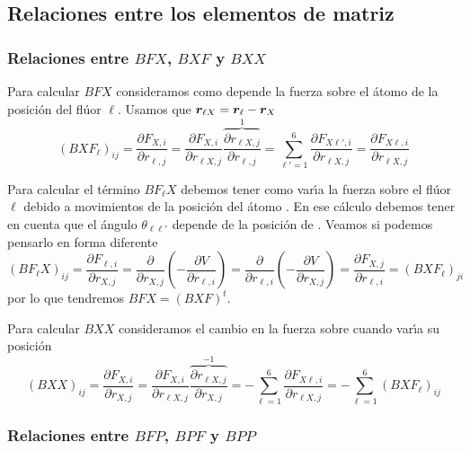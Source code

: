\subsection{Relaciones entre los elementos de matriz}
\label{S:relaciones-elementos}


\subsubsection{Relaciones entre $BFX$, $BXF$ y $BXX$}
Para calcular $BFX$ consideramos como depende la fuerza sobre el \'{a}tomo   de la posici\'{o}n del fl\'{u}or $\ell$. 
Usamos que $\bm{r}_{\ell X} = \bm{r}_{\ell} - \bm{r}_{X}$
\begin{equation}
  \label{Q:BXF-1}
  (BXF_{\ell})_{ij} = \frac{\partial F_{X,i}}{\partial r_{\ell,j}} = \frac{\partial F_{X,i}}{\partial r_{\ell X,j}} \overbrace{\frac{\partial r_{\ell X,j}}{\partial r_{\ell,j}}}^{1} = \sum_{\ell'=1}^{6} \frac{\partial F_{X\ell',i}}{\partial r_{\ell X,j}} = \frac{\partial F_{X\ell,i}}{\partial r_{\ell X,j}}
\end{equation}

Para calcular el t\'{e}rmino $BF_{\ell}X$ debemos tener como var\'{\i}a la fuerza sobre el fl\'{u}or $\ell$ debido a movimientos de la posici\'{o}n del \'{a}tomo . En ese c\'{a}lculo debemos tener en cuenta que el \'{a}ngulo $\theta_{\ell \ell'} $ depende de la posici\'{o}n de .
Veamos si podemos pensarlo en forma diferente
\begin{equation}
  \label{Q:BFX-1}
  (BF_{\ell}X)_{ij} = \frac{\partial F_{\ell,i}}{\partial r_{X,j}} = \frac{\partial}{\partial r_{X,j}} \left(- \frac{\partial V}{\partial r_{\ell,i}}  \right) =
 \frac{\partial}{\partial r_{\ell,i}} \left(- \frac{\partial V}{\partial r_{X,j}}  \right) =  \frac{\partial F_{X,j}}{\partial r_{\ell,i}} = (BXF_{\ell})_{ji}
\end{equation}
por lo que tendremos $BFX=(BXF)^{t}$.

Para calcular $BXX$ consideramos el cambio en la fuerza sobre  cuando var\'{\i}a su posici\'{o}n
\begin{equation}
  \label{Q:BXX-1}
  (BXX)_{ij} = \frac{\partial F_{X,i}}{\partial r_{X,j}} = \frac{\partial F_{X,i}}{\partial r_{\ell X,j}} \overbrace{\frac{\partial r_{\ell X,j}}{\partial r_{X,j}}}^{-1} = - \sum_{\ell=1}^{6} \frac{\partial F_{X\ell,i}}{\partial r_{\ell X,j}} = -\sum_{\ell=1}^{6} (BXF_{\ell})_{ij}
\end{equation}

\subsubsection{Relaciones entre $BFP$, $BPF$ y $BPP$}


